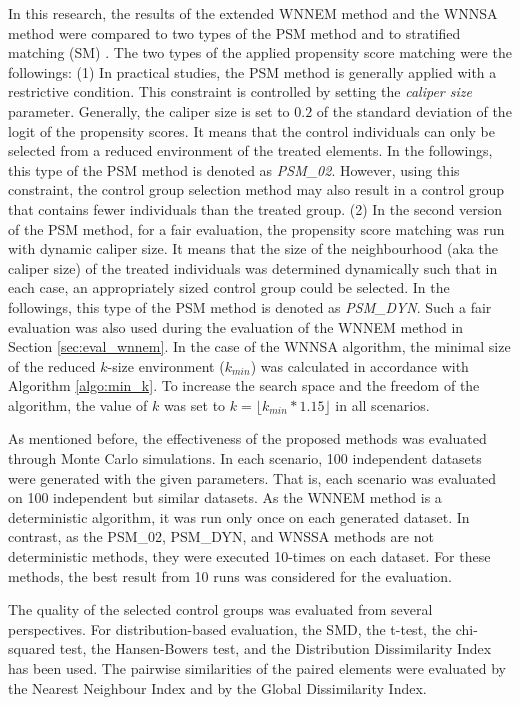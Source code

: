		In this research, the results of the extended WNNEM method and the WNNSA method were compared to two types of the PSM method and to stratified matching (SM) \cite{arnab2017survey, hankin2019sampling}. The two types of the applied propensity score matching were the followings: (1) In practical studies, the PSM method is generally applied with a restrictive condition. This constraint is controlled by setting the \textit{caliper size} parameter. Generally, the caliper size is set to $0.2$ of the standard deviation of the logit of the propensity scores. It means that the control individuals can only be selected from a reduced environment of the treated elements. In the followings, this type of the PSM method is denoted as \textit{PSM\_02}. However, using this constraint, the control group selection method may also result in a control group that contains fewer individuals than the treated group. (2) In the second version of the PSM method, for a fair evaluation, the propensity score matching was run with dynamic caliper size. It means that the size of the neighbourhood (aka the caliper size) of the treated individuals was determined dynamically such that in each case, an appropriately sized control group could be selected. In the followings, this type of the PSM method is denoted as \textit{PSM\_DYN}. Such a fair evaluation was also used during the evaluation of the WNNEM method in Section \ref{sec:eval_wnnem}. In the case of the WNNSA algorithm, the minimal size of the reduced $k$-size environment ($k_{min}$) was calculated in accordance with Algorithm \ref{algo:min_k}. To increase the search space and the freedom of the algorithm, the value of $k$ was set to $k=\lfloor k_{min}*1.15 \rfloor$ in all scenarios.
										
		As mentioned before, the effectiveness of the proposed methods was evaluated through Monte Carlo simulations. In each scenario, 100 independent datasets were generated with the given parameters. That is, each scenario was evaluated on 100 independent but similar datasets. As the WNNEM method is a deterministic algorithm, it was run only once on each generated dataset. In contrast, as the PSM\_02, PSM\_DYN, and WNSSA methods are not deterministic methods, they were executed 10-times on each dataset. For these methods, the best result from 10 runs was considered for the evaluation. 
										
		The quality of the selected control groups was evaluated from several perspectives. For distribution-based evaluation, the SMD, the t-test, the chi-squared test, the Hansen-Bowers test, and the Distribution Dissimilarity Index has been used. The pairwise similarities of the paired elements were evaluated by the Nearest Neighbour Index and by the Global Dissimilarity Index. 
				       
